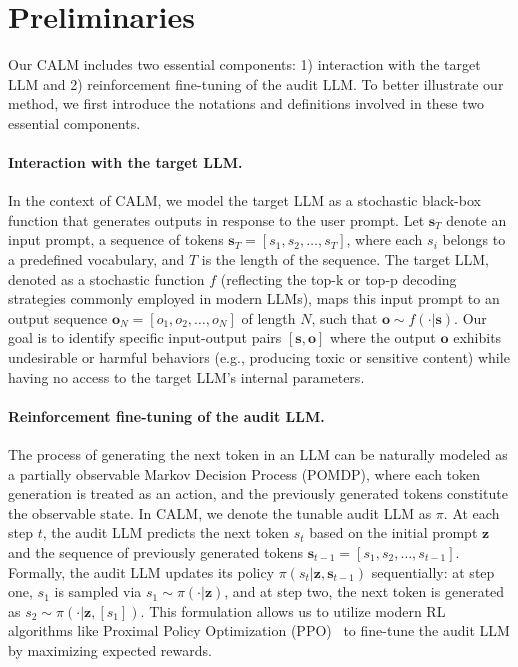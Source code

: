 \documentclass[letterpaper]{article} %
\newcommand{\ours}{\textsf{CALM}}
\def\rvo{{\mathbf{o}}}
\def\rvs{{\mathbf{s}}}
\def\rvz{{\mathbf{z}}}
\begin{document}
\section{Preliminaries}

Our {\ours} includes two essential components: 1) interaction with the target LLM and 2) reinforcement fine-tuning of the audit LLM. To better illustrate our method, we first introduce the notations and definitions involved in these two essential components.

\paragraph{Interaction with the target LLM.} In the context of {\ours}, we model the target LLM as a stochastic black-box function that generates outputs in response to the user prompt. Let \( \rvs_{T} \) denote an input prompt, a sequence of tokens \( \rvs_{T} = [s_1, s_2, \dots, s_T] \), where each \( s_i \) belongs to a predefined vocabulary, and \( T \) is the length of the sequence. The target LLM, denoted as a stochastic function \( f \) (reflecting the top-k or top-p decoding strategies commonly employed in modern LLMs), maps this input prompt to an output sequence \( \rvo_{N} = [o_1, o_2, \dots, o_{N}] \) of length \( N \), such that \( \rvo \sim f(\cdot|\rvs) \). Our goal is to identify specific input-output pairs \( [\rvs, \rvo] \) where the output \( \rvo \) exhibits undesirable or harmful behaviors (e.g., producing toxic or sensitive content) while having no access to the target LLM's internal parameters.

\paragraph{Reinforcement fine-tuning of the audit LLM.} The process of generating the next token in an LLM can be naturally modeled as a partially observable Markov Decision Process (POMDP), where each token generation is treated as an action, and the previously generated tokens constitute the observable state. In {\ours}, we denote the tunable audit LLM as \( \pi \). At each step \( t \), the audit LLM predicts the next token \( s_t \) based on the initial prompt \( \rvz \) and the sequence of previously generated tokens \( \rvs_{t-1} = [s_1, s_2, \dots, s_{t-1}] \). Formally, the audit LLM updates its policy \( \pi(s_t|\rvz, \rvs_{t-1}) \) sequentially: at step one, \( s_1 \) is sampled via \( s_1 \sim \pi(\cdot|\rvz) \), and at step two, the next token is generated as \( s_2 \sim \pi(\cdot|\rvz, [s_1]) \). This formulation allows us to utilize modern RL algorithms like Proximal Policy Optimization (PPO)~\cite{schulman2017proximal} to fine-tune the audit LLM by maximizing expected rewards.
\end{document}
